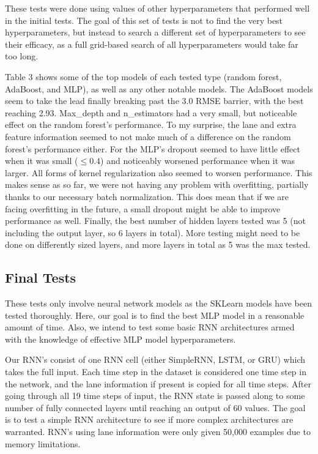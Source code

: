 \documentclass{article}
\begin{document}
These tests were done using values of other hyperparameters that performed well in the initial tests. The goal of this set of tests is not to find the very best hyperparameters, but instead to search a different set of hyperparameters to see their efficacy, as a full grid-based search of all hyperparameters would take far too long.

Table 3 shows some of the top models of each tested type (random forest, AdaBoost, and MLP), as well as any other notable models. The AdaBoost models seem to take the lead finally breaking past the 3.0 RMSE barrier, with the best reaching 2.93. Max\_depth and n\_estimators had a very small, but noticeable effect on the random forest's performance. To my surprise, the lane and extra feature information seemed to not make much of a difference on the random forest's performance either. For the MLP's dropout seemed to have little effect when it was small ($\leq 0.4$) and noticeably worsened performance when it was larger. All forms of kernel regularization also seemed to worsen performance. This makes sense as so far, we were not having any problem with overfitting, partially thanks to our necessary batch normalization. This does mean that if we are facing overfitting in the future, a small dropout might be able to improve performance as well. Finally, the best number of hidden layers tested was 5 (not including the output layer, so 6 layers in total). More testing might need to be done on differently sized layers, and more layers in total as 5 was the max tested.

\subsection{Final Tests}

These tests only involve neural network models as the SKLearn models have been tested thoroughly. Here, our goal is to find the best MLP model in a reasonable amount of time. Also, we intend to test some basic RNN architectures armed with the knowledge of effective MLP model hyperparameters.

Our RNN's consist of one RNN cell (either SimpleRNN, LSTM, or GRU) which takes the full input. Each time step in the dataset is considered one time step in the network, and the lane information if present is copied for all time steps. After going through all 19 time steps of input, the RNN state is passed along to some number of fully connected layers until reaching an output of 60 values. The goal is to test a simple RNN architecture to see if more complex architectures are warranted. RNN's using lane information were only given 50,000 examples due to memory limitations.
\end{document}
